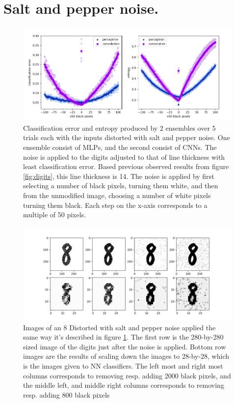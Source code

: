 \section{Salt and pepper noise.}

\begin{figure}
    \centering
    \includegraphics[scale=0.6]{figure/trippySaltnPepper.png}
    \caption{Classification error and entropy produced by 2 ensembles over 5 trials each with the inputs distorted with salt and pepper noise. One ensemble consist of MLPs, and the second consist of CNNs. The noise is applied to the digits adjusted to that of line thickness with least classification error. Based previous observed results from figure \ref{fig:digits}, this line thickness is 14. The noise is applied by first selecting a number of black pixels, turning them white, and then from the unmodified image, choosing a number of white pixels turning them black. Each step on the x-axis corresponds to a multiple of 50 pixels.}
    \label{fig:saltpepper1}
\end{figure}

\begin{figure}
    \centering
    \includegraphics[scale=0.5]{figure/digitsSaltnpepper.png}
    \caption{Images of an 8 Distorted with salt and pepper noise applied the same way it's described in figure \ref{fig:saltpepper1}. The first row is the 280-by-280 sized image of the digits just after the noise is applied. Bottom row images are the results of scaling down the images to 28-by-28, which is the images given to NN classifiers. The left most and right most columns corresponds to removing resp. adding 2000 black pixels, and the middle left, and middle right columns corresponds to removing resp. adding 800 black pixels}
    \label{fig:digitssaltandpepper}
\end{figure}

